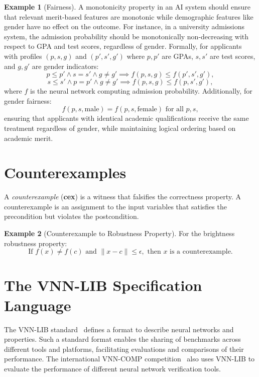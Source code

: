 \documentclass[oneside,11pt,dvipsnames]{book}
\numberwithin{equation}{section}
\theoremstyle{definition}
\newtheorem{example}{Example}[section]
\theoremstyle{remark}
\begin{document}
\begin{example}[Fairness]
    A monotonicity property in an AI system should ensure that relevant merit-based features are monotonic while demographic features like gender have no effect on the outcome. For instance, in a university admissions system, the admission probability should be monotonically non-decreasing with respect to GPA and test scores, regardless of gender. Formally, for applicants with profiles $(p, s, g)$ and $(p', s', g')$ where $p, p'$ are GPAs, $s, s'$ are test scores, and $g, g'$ are gender indicators:
\[
p \leq p' \land s = s' \land g \neq g' \implies f(p, s, g) \leq f(p', s', g'),
\]
\[
s \leq s' \land p = p' \land g \neq g' \implies f(p, s, g) \leq f(p, s', g'),
\]
where $f$ is the neural network computing admission probability. Additionally, for gender fairness:
\[
f(p, s, \text{male}) = f(p, s, \text{female}) \text{ for all } p, s,
\]
ensuring that applicants with identical academic qualifications receive the same treatment regardless of gender, while maintaining logical ordering based on academic merit.
\end{example}



\section{Counterexamples}\label{sec:counterexamples}

A \emph{counterexample} (\textbf{cex}) is a witness that falsifies the correctness property. A counterexample is an assignment to the input variables that satisfies the precondition but violates the postcondition.

\begin{example}[Counterexample to Robustness Property]
For the brightness robustness property:
\[
\text{If } f(x) \neq f(c) \text{ and } \|x - c\| \leq \epsilon, \text{ then } x \text{ is a counterexample.}
\]
\end{example}


\section{The VNN-LIB  Specification Language}


The VNN-LIB standard~\cite{demarchi2023supporting,vnnlib} defines a format to describe neural networks and properties. Such a standard format enables the sharing of benchmarks across different tools and platforms, facilitating evaluations and comparisons of their performance. The international VNN-COMP competition~\cite{brix2024fifth} also uses VNN-LIB to evaluate the performance of different neural network verification tools.
\end{document}
